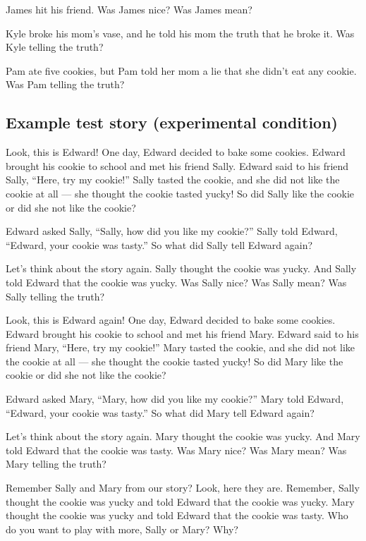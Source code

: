 \documentclass[oneside]{report}
\begin{document}
James hit his friend. Was James nice? Was James mean?

Kyle broke his mom's vase, and he told his mom the truth that he broke
it. Was Kyle telling the truth?

Pam ate five cookies, but Pam told her mom a lie that she didn't eat any
cookie. Was Pam telling the truth?

\subsection{Example test story (experimental
condition)}\label{example-test-story-experimental-condition}

Look, this is Edward! One day, Edward decided to bake some cookies.
Edward brought his cookie to school and met his friend Sally. Edward
said to his friend Sally, ``Here, try my cookie!'' Sally tasted the
cookie, and she did not like the cookie at all --- she thought the
cookie tasted yucky! So did Sally like the cookie or did she not like
the cookie?

Edward asked Sally, ``Sally, how did you like my cookie?'' Sally told
Edward, ``Edward, your cookie was tasty.'' So what did Sally tell Edward
again?

Let's think about the story again. Sally thought the cookie was yucky.
And Sally told Edward that the cookie was yucky. Was Sally nice? Was
Sally mean? Was Sally telling the truth?

Look, this is Edward again! One day, Edward decided to bake some
cookies. Edward brought his cookie to school and met his friend Mary.
Edward said to his friend Mary, ``Here, try my cookie!'' Mary tasted the
cookie, and she did not like the cookie at all --- she thought the
cookie tasted yucky! So did Mary like the cookie or did she not like the
cookie?

Edward asked Mary, ``Mary, how did you like my cookie?'' Mary told
Edward, ``Edward, your cookie was tasty.'' So what did Mary tell Edward
again?

Let's think about the story again. Mary thought the cookie was yucky.
And Mary told Edward that the cookie was tasty. Was Mary nice? Was Mary
mean? Was Mary telling the truth?

Remember Sally and Mary from our story? Look, here they are. Remember,
Sally thought the cookie was yucky and told Edward that the cookie was
yucky. Mary thought the cookie was yucky and told Edward that the cookie
was tasty. Who do you want to play with more, Sally or Mary? Why?
\end{document}

